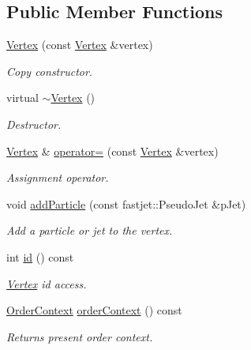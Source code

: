 \subsection*{Public Member Functions}
\begin{CompactItemize}
\item 
\hyperlink{classVertex_f0cf7fa1f632e6d3a17eda8f29795a08}{Vertex} (const \hyperlink{classVertex}{Vertex} \&vertex)
\begin{CompactList}\small\item\em Copy constructor. \item\end{CompactList}\item 
\hypertarget{classVertex_5bef863d5861285cbdbe9a1d72bc5ab6}{
virtual \hyperlink{classVertex_5bef863d5861285cbdbe9a1d72bc5ab6}{$\sim$Vertex} ()}
\label{classVertex_5bef863d5861285cbdbe9a1d72bc5ab6}

\begin{CompactList}\small\item\em Destructor. \item\end{CompactList}\item 
\hyperlink{classVertex}{Vertex} \& \hyperlink{classVertex_d02d78d2a640cdc2f7ef1eb95f36ef79}{operator=} (const \hyperlink{classVertex}{Vertex} \&vertex)
\begin{CompactList}\small\item\em Assignment operator. \item\end{CompactList}\item 
void \hyperlink{classVertex_074af7ae6f1948dbe9704516ed7575f4}{add\-Particle} (const fastjet::Pseudo\-Jet \&p\-Jet)
\begin{CompactList}\small\item\em Add a particle or jet to the vertex. \item\end{CompactList}\item 
\hypertarget{classVertex_a82222b2fc0be418e1ced34126520f1a}{
int \hyperlink{classVertex_a82222b2fc0be418e1ced34126520f1a}{id} () const }
\label{classVertex_a82222b2fc0be418e1ced34126520f1a}

\begin{CompactList}\small\item\em \hyperlink{classVertex}{Vertex} id access. \item\end{CompactList}\item 
\hypertarget{classVertex_4be1c8b4e631c4206d8ecbd2c1c9448f}{
\hyperlink{classVertex_40a06cc3fde98913c8259e3c11cd37ec}{Order\-Context} \hyperlink{classVertex_4be1c8b4e631c4206d8ecbd2c1c9448f}{order\-Context} () const }
\label{classVertex_4be1c8b4e631c4206d8ecbd2c1c9448f}

\begin{CompactList}\small\item\em Returns present order context. \item\end{CompactList}\end{CompactItemize}
